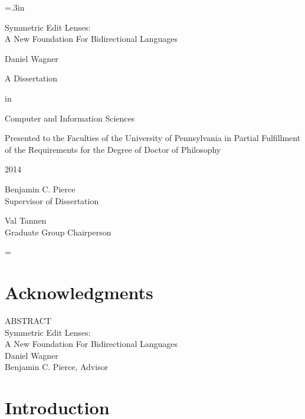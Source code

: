 \documentclass[12pt]{report}
\newcommand{\doublespaced}{\renewcommand{\baselinestretch}{2}\normalfont}
\newcommand{\singlespaced}{\renewcommand{\baselinestretch}{1}\normalfont}
\newcommand{\draftspaced}{\ifdraft\singlespaced\else\doublespaced\fi}
\numberwithin{equation}{section}
\def\thetitle{Symmetric Edit Lenses:\\A New Foundation For Bidirectional Languages}
\def\theauthor{Daniel Wagner}
\def\theadvisor{Benjamin C. Pierce, Advisor}
\def\theyear{2014}
\begin{document}
\doublespaced
\large\newlength{\oldparskip}\setlength\oldparskip{\parskip}\parskip=.3in
\thispagestyle{empty}
\begin{center}
\vspace*{\fill}
\thetitle

\theauthor


A Dissertation

in

Computer and Information Sciences
\end{center}


\noindent\singlespaced\large
Presented to the Faculties of the University of Pennsylvania in Partial
Fulfillment of the Requirements for the Degree of Doctor of Philosophy


\doublespaced\large
\begin{center}
\theyear
\end{center}


\noindent\makebox[0in][l]{\rule[2ex]{3in}{.3mm}}
\singlespaced
Benjamin C. Pierce\\
Supervisor of Dissertation


\noindent\makebox[0in][l]{\rule[2ex]{3in}{.3mm}}
\singlespaced
Val Tannen\\
Graduate Group Chairperson
\vspace*{\fill}

\normalsize\parskip=\oldparskip


\newpage
\doublespaced

\chapter*{Acknowledgments}

\newpage
\begin{center}
  ABSTRACT\\
\thetitle\\
\vspace{.5in}
  \theauthor\\
  \theadvisor
\end{center}

\doublespaced
\noindent


\vspace*{\fill}

\newpage

\tableofcontents

\newpage
\draftspaced
{}

\chapter{Introduction}
\label{chap:introduction}
\end{document}
